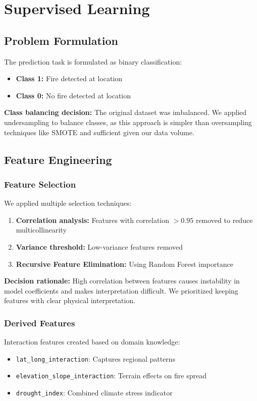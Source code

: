 \chapter{Supervised Learning}

\section{Problem Formulation}
The prediction task is formulated as binary classification:
\begin{itemize}
    \item \textbf{Class 1:} Fire detected at location
    \item \textbf{Class 0:} No fire detected at location
\end{itemize}

\textbf{Class balancing decision:} The original dataset was imbalanced. We applied undersampling to balance classes, as this approach is simpler than oversampling techniques like SMOTE and sufficient given our data volume.

\section{Feature Engineering}

\subsection*{Feature Selection}
We applied multiple selection techniques:
\begin{enumerate}
    \item \textbf{Correlation analysis:} Features with correlation $> 0.95$ removed to reduce multicollinearity
    \item \textbf{Variance threshold:} Low-variance features removed
    \item \textbf{Recursive Feature Elimination:} Using Random Forest importance
\end{enumerate}

\textbf{Decision rationale:} High correlation between features causes instability in model coefficients and makes interpretation difficult. We prioritized keeping features with clear physical interpretation.

\subsection*{Derived Features}
Interaction features created based on domain knowledge:
\begin{itemize}
    \item \texttt{lat\_long\_interaction}: Captures regional patterns
    \item \texttt{elevation\_slope\_interaction}: Terrain effects on fire spread
    \item \texttt{drought\_index}: Combined climate stress indicator
\end{itemize}

